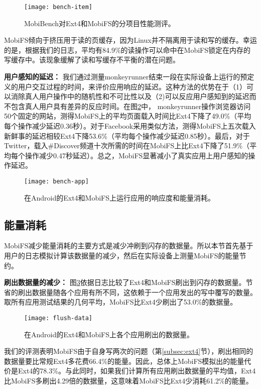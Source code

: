 \begin{figure}[!ht]
  \centering
  \texttt{[image: bench-item]}
  \caption{MobiBench对Ext4和MobiFS的分项目性能测评。}
  \label{fig:bench-item}
\end{figure}

MobiFS倾向于挤压用于读的页缓存，因为Linux并不隔离用于读和写的缓存。幸运的是，根据我们的日志，平均有84.9\%的读操作可以命中在MobiFS锁定在内存的写缓存中。该现象缓解了读和写缓存不平衡的潜在问题。

\noindent\textbf{用户感知的延迟：}
我们通过测量monkeyrunner结束一段在实际设备上运行的预定义的用户交互过程的时间，来评价应用响应的延迟。这种方法的优势在于（1）可以消除真人用户操作中的随机性和不可比性以及（2)可以反应用户感知到的延迟而不包含真人用户具有差异的反应时间。在图\ref{fig:bench-app}中， monkeyrunner操作浏览器访问50个固定的网站，测得MobiFS上的平均页面载入时间比Ext4下降了49.0\%（平均每个操作减少延迟0.36秒）。对于Facebook采用类似方法，测得MobiFS上五次载入新鲜事的延迟相较Ext4下降53.6\%（平均每个操作减少延迟0.85秒）。最后，对于Twitter，载入\#Discover频道十次所需的时间在MobiFS上比Ext4下降了51.9\%（平均每个操作减少0.47秒延迟）。总之，MobiFS显著减小了真实应用上用户感知的操作延迟。

\begin{figure}[!ht]
  \centering
  \texttt{[image: bench-app]}
  \caption{在Android的Ext4和MobiFS上运行应用的响应度和能量消耗。}
  \label{fig:bench-app}
\end{figure}

\subsection{能量消耗} \label{subsec-eval-energy}

MobiFS减少能量消耗的主要方式是减少冲刷到闪存的数据量。所以本节首先基于用户的日志模拟计算该数据量的减少，然后在实际设备上测量MobiFS的能量节约。

\noindent\textbf{刷出数据量的减少：}
图\ref{fig:flush-data}依据日志比较了Ext4和MobiFS刷出到闪存的数据量。节省的刷出数据量随各个应用有所不同，这依赖于一个应用发出的写中覆写的数量。取所有应用测试结果的几何平均，MobiFS比Ext4少刷出了53.0\%的数据量。

\begin{figure}[!ht]
  \centering
  \texttt{[image: flush-data]}
  \caption{在Android的Ext4和MobiFS上各个应用刷出的数据量。}
  \label{fig:flush-data}
\end{figure}

我们的评测表明MobiFS由于自身写两次的问题（第\ref{subsec:ext4}节），刷出相同的数据量要比常规Ext4多花费66.4\%的能量。因此，总体上MobiFS模拟出的能量代价是Ext4的78.3\%。与此同时，如果我们计算所有应用刷出数据量的平均值，Ext4比MobiFS多刷出4.29倍的数据量，这意味着MobiFS比Ext4少消耗61.2\%的能量。

